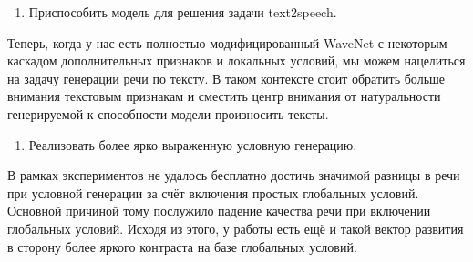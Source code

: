 \documentclass[../diploma.tex]{subfiles}
\begin{document}
\begin{enumerate}
    \item Приспособить модель для решения задачи text2speech.
\end{enumerate}
Теперь, когда у нас есть полностью модифицированный WaveNet с некоторым каскадом дополнительных признаков и локальных условий, мы можем нацелиться на задачу генерации речи по тексту. В таком контексте стоит обратить больше внимания текстовым признакам и сместить центр внимания от натуральности генерируемой к  способности модели произносить тексты.

\begin{enumerate}[resume]
    \item Реализовать более ярко выраженную условную генерацию.
\end{enumerate}
В рамках экспериментов не удалось бесплатно достичь значимой разницы в речи при условной генерации за счёт включения простых глобальных условий. Основной причиной тому послужило падение качества речи при включении глобальных условий. Исходя из этого, у работы есть ещё и такой вектор развития в сторону более яркого контраста на базе глобальных условий.
\end{document}
